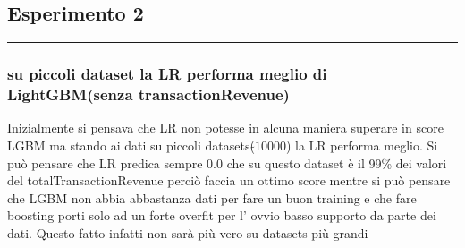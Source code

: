 \documentclass[11pt]{article}
\begin{document}
    \subsection{Esperimento 2}\label{esperimento-2}

\begin{center}\rule{0.5\linewidth}{\linethickness}\end{center}

\subsubsection{su piccoli dataset la LR performa meglio di
LightGBM(senza
transactionRevenue)}\label{su-piccoli-dataset-la-lr-performa-meglio-di-lightgbmsenza-transactionrevenue}

Inizialmente si pensava che LR non potesse in alcuna maniera superare in
score LGBM ma stando ai dati su piccoli datasets(\(\tilde{}10000\)) la
LR performa meglio. Si può pensare che LR predica sempre 0.0 che su
questo dataset è il 99\% dei valori del totalTransactionRevenue perciò
faccia un ottimo score mentre si può pensare che LGBM non abbia
abbastanza dati per fare un buon training e che fare boosting porti solo
ad un forte overfit per l' ovvio basso supporto da parte dei dati.
Questo fatto infatti non sarà più vero su datasets più grandi
\end{document}

